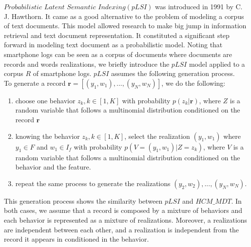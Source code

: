$Probabilistic$ $Latent$ $Semantic$ $Indexing(pLSI)$ was introduced in 1991 by C. J. Hawthorn\cite{plsi}. It came as a good alternative to the problem of modeling a corpus of text documents. This model allowed research to make big jump in information retrieval and text document representation. It constituted a significant step forward in modeling text document as a probabilistic model. Noting that smartphone logs can be seen as a corpus of documents where documents are records and words realizations, we briefly introduce the $pLSI$ model applied to a corpus $R$ of smartphone logs. $pLSI$ assumes the following generation process.
\\To generate a record $\mathbf{r}=[(y_{1},w_{1}),...,(y_{N},w_{N})]$, we do the following:
\begin{enumerate} 
	\item choose one behavior $z_{k},k\in [1,K]$ with probability $p(z_{k}|\mathbf{r})$, where $Z$ is a random variable that follows a multinomial distribution conditioned on the record $\mathbf{r}$
	\item knowing the behavior $z_{k},k\in [1,K]$, select the realization $(y_{1},w_{1})$ where $y_{1}\in F$ and $w_{1}\in I_{f}$ with probability $p(V=(y_{1},w_{1})|Z=z_{k})$, where $V$ is a random variable that follows a 				multinomial distribution conditioned on the behavior and the feature.
	\item repeat the same process to generate the realizations $(y_{2},w_{2}),...,(y_{N},w_{N})$. 
\end{enumerate} 
This generation process shows the similarity between $pLSI$ and $HCM\_MDT$. In both cases, we assume that a record is composed by a mixture of behaviors and each behavior is represented as a mixture of realizations. Moreover, a realizations are independent between each other, and a realization is independent from the record it appears in conditioned in the behavior.\par

